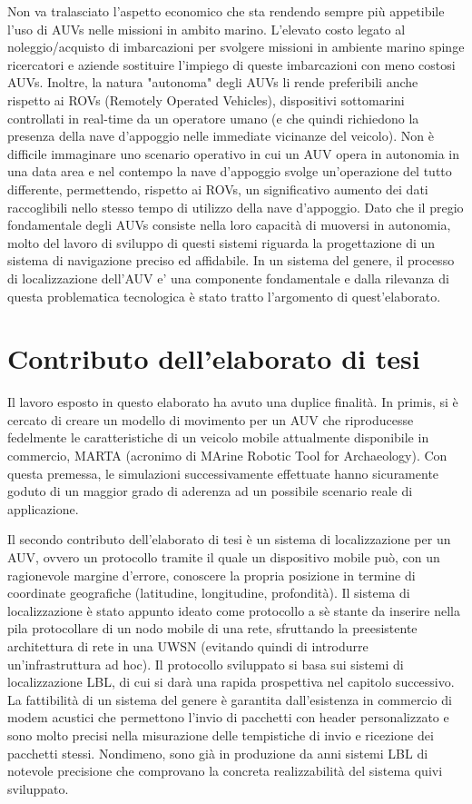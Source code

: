 \documentclass[Lau,binding=0.6cm]{sapthesis}
\begin{document}
Non va tralasciato l'aspetto economico che sta rendendo sempre più appetibile l'uso di AUVs nelle missioni in ambito marino. L'elevato costo legato al noleggio/acquisto di imbarcazioni per svolgere missioni in ambiente marino spinge ricercatori e aziende sostituire l'impiego di queste imbarcazioni con meno costosi AUVs. Inoltre, la natura "autonoma" degli AUVs li rende preferibili anche rispetto ai ROVs (Remotely Operated Vehicles), dispositivi sottomarini controllati in real-time da un operatore umano (e che quindi richiedono la presenza della nave d'appoggio nelle immediate vicinanze del veicolo). Non è difficile immaginare uno scenario operativo in cui un AUV opera in autonomia in una data area e nel contempo la nave d'appoggio svolge un'operazione del tutto differente, permettendo, rispetto ai ROVs, un significativo aumento dei dati raccoglibili nello stesso tempo di utilizzo della nave d'appoggio. \newline
Dato che il pregio fondamentale degli AUVs consiste nella loro capacità di muoversi in autonomia, molto del lavoro di sviluppo di questi sistemi riguarda la progettazione di un sistema di navigazione preciso ed affidabile. In un sistema del genere, il processo di localizzazione dell'AUV e' una componente fondamentale e dalla rilevanza di questa problematica tecnologica è stato tratto l'argomento di quest'elaborato.


\section{Contributo dell'elaborato di tesi}
Il lavoro esposto in questo elaborato ha avuto una duplice finalità.
In primis, si è cercato di creare un modello di movimento per un AUV che riproducesse fedelmente le caratteristiche di un veicolo mobile attualmente disponibile in commercio,  MARTA (acronimo di MArine Robotic Tool for Archaeology). Con questa premessa, le simulazioni successivamente effettuate hanno sicuramente goduto di un maggior grado di aderenza ad un possibile scenario reale di applicazione.
\par
Il secondo contributo dell'elaborato di tesi è un sistema di localizzazione per un AUV, ovvero un protocollo tramite il quale un dispositivo mobile può, con un ragionevole margine d'errore, conoscere la propria posizione in termine di coordinate geografiche (latitudine, longitudine, profondità).
Il sistema di localizzazione è stato appunto ideato come protocollo a sè stante da inserire nella pila protocollare di un nodo mobile di una rete, sfruttando la preesistente   architettura di rete  in una UWSN (evitando quindi di introdurre un'infrastruttura ad hoc).
Il protocollo sviluppato si basa sui sistemi di localizzazione LBL, di cui si darà una rapida prospettiva nel capitolo successivo. La fattibilità di un sistema del genere è garantita dall'esistenza in commercio di modem acustici che permettono l'invio di pacchetti con header personalizzato e sono molto precisi nella misurazione delle tempistiche di invio e ricezione dei pacchetti stessi. Nondimeno, sono già in produzione da anni sistemi LBL di notevole precisione \cite{lblsonardyne} che comprovano la concreta realizzabilità del sistema quivi sviluppato.
\end{document}
